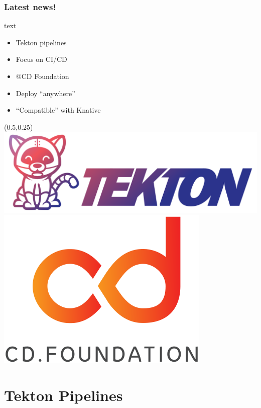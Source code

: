 \documentclass[aspectratio=169,11pt,hyperref={colorlinks=true}]{beamer}
\begin{document}
\begin{lblackrwhiteframe}
\begin{lblackrwhiteframe}
\begin{lblackrwhiteframe}
  \frametitle{Latest news!}
  \large
  \begin{beamercolorbox}[wd=0.3\paperwidth]{text}
    \begin{itemize}
      \item Tekton pipelines
      \item Focus on CI/CD
      \item @CD Foundation
      \item Deploy ``anywhere''
      \item ``Compatible'' with Knative
    \end{itemize}
  \end{beamercolorbox}%
  \begin{textblock*}{0.5\paperwidth}(0.5\paperwidth,0.25\paperheight)
    \centering
    \includegraphics[width=0.35\paperwidth]{img/tekton-horizontal-color.png}
    \includegraphics[width=0.20\paperwidth]{img/cdf-color.png}
  \end{textblock*}
\end{lblackrwhiteframe}

\section{Tekton Pipelines}


\end{lblackrwhiteframe}
\end{lblackrwhiteframe}
\end{document}
